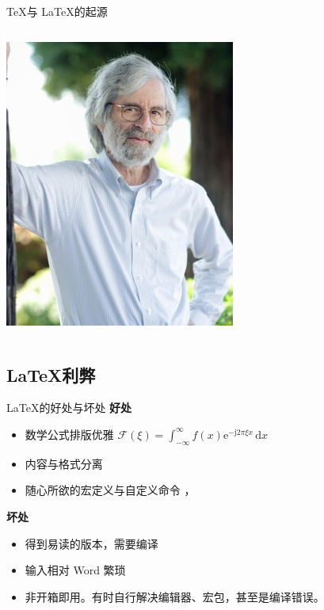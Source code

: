 \begin{frame}[fragile]{\TeX 与 \LaTeX 的起源}
\begin{columns}[T]
    \includegraphics[width=\textwidth]{Lamport.jpg}

  \end{columns}
\end{frame}

\subsection{\LaTeX 利弊}

\begin{frame}[fragile]{\LaTeX 的好处与坏处}
    \textbf{好处}
    \begin{itemize}
        \item 数学公式排版优雅 \quad $\mathcal{F}(\xi)=\int_{-\infty}^{\infty} f(x)\mathrm{e}^{-\mathrm{j}2\pi \xi x}\,\mathrm{d}x$
        \item 内容与格式分离
        \item 随心所欲的宏定义与自定义命令 ，
    \end{itemize}

    \vspace{2em}
    \textbf{坏处}
    \begin{itemize}
        \item 得到易读的版本，需要编译
        \item 输入相对 Word 繁琐
        \item 非开箱即用。有时自行解决编辑器、宏包，甚至是编译错误。
    \end{itemize}

\end{frame}

